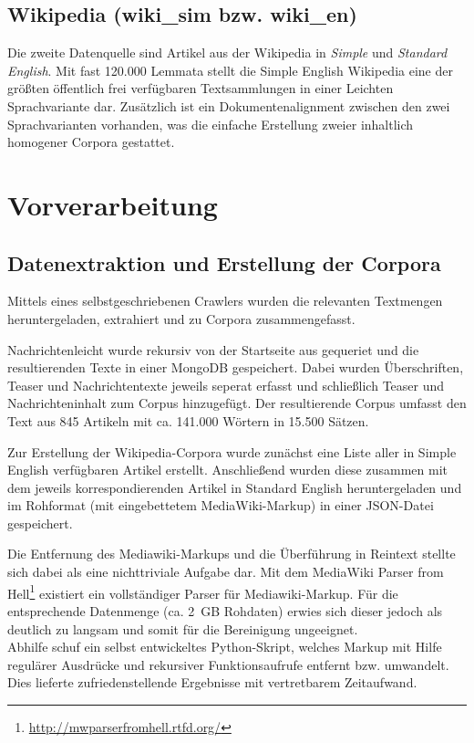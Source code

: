 \documentclass[11pt, a4paper]{article}
\begin{document}
\subsection{Wikipedia (wiki\_sim bzw. wiki\_en)}
\label{corp-wiki}
Die zweite Datenquelle sind Artikel aus der Wikipedia in \emph{Simple} und
\emph{Standard English}. Mit fast 120.000 Lemmata stellt die Simple English
Wikipedia eine der gr\"o\ss{}ten \"offentlich frei verf\"ugbaren Textsammlungen
in einer Leichten Sprachvariante dar.
Zus\"atzlich ist ein Dokumentenalignment zwischen den zwei Sprachvarianten
vorhanden, was die einfache Erstellung zweier inhaltlich homogener Corpora
gestattet.


\section{Vorverarbeitung}
\label{sec:vorverarb}

\subsection{Datenextraktion und Erstellung der Corpora}
\label{datextr}

Mittels eines selbstgeschriebenen Crawlers wurden die relevanten Textmengen
heruntergeladen, extrahiert und zu Corpora zusammengefasst.

Nachrichtenleicht wurde rekursiv von der Startseite aus gequeriet
und die resultierenden Texte in einer MongoDB gespeichert.
Dabei wurden Überschriften, Teaser und Nachrichtentexte jeweils seperat erfasst
und schließlich Teaser und Nachrichteninhalt zum Corpus hinzugefügt.
Der resultierende Corpus umfasst den Text aus 845 Artikeln mit ca. 141.000
Wörtern in 15.500 Sätzen.

Zur Erstellung der Wikipedia-Corpora wurde zunächst eine Liste aller
in Simple English verfügbaren Artikel erstellt. Anschließend wurden diese
zusammen mit dem jeweils korrespondierenden Artikel in Standard English
heruntergeladen und im Rohformat (mit eingebettetem MediaWiki-Markup) in einer
JSON-Datei gespeichert.

Die Entfernung des Mediawiki-Markups und die Überführung in Reintext stellte
sich dabei als eine nichttriviale Aufgabe dar.
Mit dem MediaWiki Parser from
Hell\footnote{\url{http://mwparserfromhell.rtfd.org/}} existiert ein
vollständiger Parser für Mediawiki-Markup.
Für die entsprechende Datenmenge (ca. 2~GB Rohdaten) erwies sich dieser jedoch
als deutlich zu langsam und somit für die Bereinigung ungeeignet.
\\
Abhilfe schuf ein selbst entwickeltes Python-Skript, welches Markup mit Hilfe
regul\"arer Ausdr\"ucke und rekursiver Funktionsaufrufe entfernt bzw. umwandelt.
Dies lieferte zufriedenstellende Ergebnisse mit vertretbarem Zeitaufwand.
\end{document}
